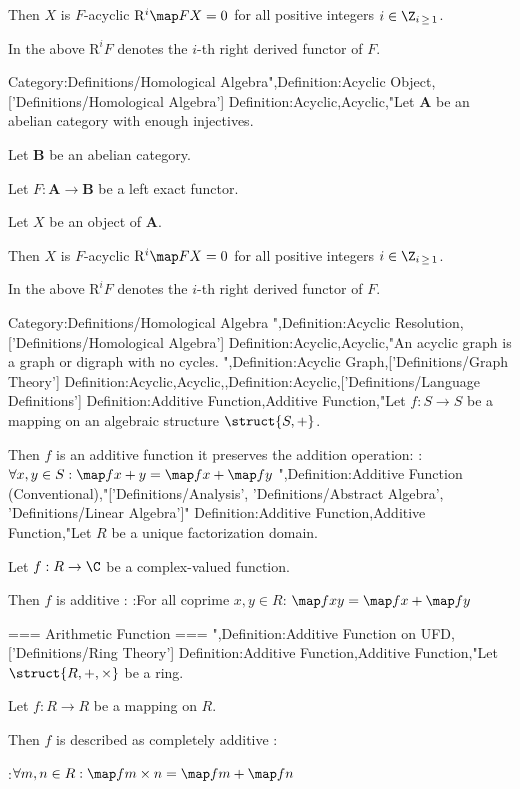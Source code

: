 Then $X$ is $F$-acyclic  $\mathrm R^i \map F X = 0$ for all positive integers $i \in \Z_{i \mathop \ge 1}$.

In the above $\mathrm R^i F$ denotes the $i$-th right derived functor of $F$.


Category:Definitions/Homological Algebra",Definition:Acyclic Object,['Definitions/Homological Algebra']
Definition:Acyclic,Acyclic,"Let $\mathbf A$ be an abelian category with enough injectives.

Let $\mathbf B$ be an abelian category.

Let $F : \mathbf A \to \mathbf B$ be a left exact functor.

Let $X$ be an object of $\mathbf A$.


Then $X$ is $F$-acyclic  $\mathrm R^i \map F X = 0$ for all positive integers $i \in \Z_{i \mathop \ge 1}$.

In the above $\mathrm R^i F$ denotes the $i$-th right derived functor of $F$.


Category:Definitions/Homological Algebra
",Definition:Acyclic Resolution,['Definitions/Homological Algebra']
Definition:Acyclic,Acyclic,"An acyclic graph is a graph or digraph with no cycles.
",Definition:Acyclic Graph,['Definitions/Graph Theory']
Definition:Acyclic,Acyclic,,Definition:Acyclic,['Definitions/Language Definitions']
Definition:Additive Function,Additive Function,"Let $f: S \to S$ be a mapping on an algebraic structure $\struct {S, +}$.


Then $f$ is an additive function  it preserves the addition operation:
:$\forall x, y \in S: \map f {x + y} = \map f x + \map f y$
",Definition:Additive Function (Conventional),"['Definitions/Analysis', 'Definitions/Abstract Algebra', 'Definitions/Linear Algebra']"
Definition:Additive Function,Additive Function,"Let $R$ be a unique factorization domain.

Let $f : R \to \C$ be a complex-valued function.


Then $f$ is additive :
:For all coprime $x, y \in R$: $\map f {x y} = \map f x + \map f y$


=== Arithmetic Function ===
",Definition:Additive Function on UFD,['Definitions/Ring Theory']
Definition:Additive Function,Additive Function,"Let $\struct {R, +, \times}$ be a ring.

Let $f: R \to R$ be a mapping on $R$.


Then $f$ is described as completely additive :

:$\forall m, n \in R: \map f {m \times n} = \map f m + \map f n$


